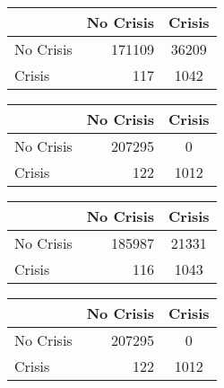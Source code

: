 \begin{table}
    \begin{center}
        \begin{subtable}[c]{0.4\textwidth}
            \begin{tabular}{lrc}
                \hline
                 & No Crisis & Crisis \\
                \hline
                No Crisis & 171109 & 36209 \\
                Crisis & 117 & 1042\\
                \hline
            \end{tabular}
            \label{tab:mat-conf-raw-1.4}
        \end{subtable}
        \hspace{1em}\vspace{1em}
        \begin{subtable}[c]{0.4\textwidth}
                \begin{tabular}{lrc}
                \hline
                 & No Crisis & Crisis \\
                \hline
                No Crisis & 207295 & 0 \\
                Crisis & 122 & 1012\\
                \hline
            \end{tabular}
            \label{tab:mat-conf-stats-1.4}
        \end{subtable}
        
        \begin{subtable}[c]{0.4\textwidth}
            \begin{tabular}{lrc}
                \hline
                 & No Crisis & Crisis \\
                \hline
                No Crisis & 185987 & 21331 \\
                Crisis & 116 & 1043\\
                \hline
            \end{tabular}
            \label{tab:mat-conf-raw-1}
        \end{subtable}
        \hspace{1em}\vspace{1em}
        \begin{subtable}[c]{0.4\textwidth}
                \begin{tabular}{lrc}
                \hline
                 & No Crisis & Crisis \\
                \hline
                No Crisis & 207295 & 0 \\
                Crisis & 122 & 1012\\
                \hline
            \end{tabular}
            \label{tab:mat-conf-stats-1.5}
        \end{subtable}
        

\end{center}
\end{table}
